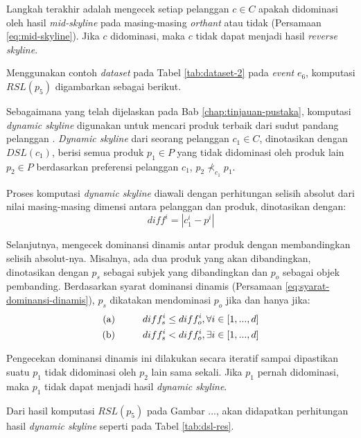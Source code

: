 Langkah terakhir adalah mengecek setiap pelanggan $c \in C$ apakah didominasi oleh hasil \textit{mid-skyline} pada masing-masing \textit{orthant} atau tidak (Persamaan \ref{eq:mid-skyline}). Jika $c$ didominasi, maka $c$ tidak dapat menjadi hasil \textit{reverse skyline}.

Menggunakan contoh \textit{dataset} pada Tabel \ref{tab:dataset-2} pada \textit{event} $e_6$, komputasi $RSL(p_5)$ digambarkan sebagai berikut.


Sebagaimana yang telah dijelaskan pada Bab \ref{chap:tinjauan-pustaka}, komputasi \textit{dynamic skyline} digunakan untuk mencari produk terbaik dari sudut pandang pelanggan \cite{kmpp}. \textit{Dynamic skyline} \cite{dynamic-skyline} dari seorang pelanggan $c_1 \in C$, dinotasikan dengan $DSL(c_1)$, berisi semua produk $p_1 \in P$ yang tidak didominasi oleh produk lain $p_2 \in P$ berdasarkan preferensi pelanggan $c_1$, $p_2 \nprec_{c_1} p_1$. 

Proses komputasi \textit{dynamic skyline} diawali dengan perhitungan selisih absolut dari nilai masing-masing dimensi antara pelanggan dan produk, dinotasikan dengan:
\begin{equation}\label{eq:diff}
diff^i = |c_1^i - p^i|
\end{equation}

Selanjutnya, mengecek dominansi dinamis antar produk dengan membandingkan selisih absolut-nya. Misalnya, ada dua produk yang akan dibandingkan, dinotasikan dengan $p_s$ sebagai subjek yang dibandingkan dan $p_o$ sebagai objek pembanding. Berdasarkan syarat dominansi dinamis (Persamaan \ref{eq:syarat-dominansi-dinamis}), $p_s$ dikatakan mendominasi $p_o$ jika dan hanya jika:
\begin{equation}\label{eq:komputasi-dsl}
\begin{split}
\text{(a)} \hspace*{1cm} diff_s^i \leq diff_o^i, \forall i \in [1, ..., d] \\
\text{(b)} \hspace*{1cm} diff_s^i < diff_o^i, \exists i \in [1, ..., d]
\end{split}
\end{equation}

Pengecekan dominansi dinamis ini dilakukan secara iteratif sampai dipastikan suatu $p_1$ tidak didominasi oleh $p_2$ lain sama sekali. Jika $p_1$ pernah didominasi, maka $p_1$ tidak dapat menjadi hasil \textit{dynamic skyline}.

Dari hasil komputasi $RSL(p_5)$ pada Gambar ..., akan didapatkan perhitungan hasil \textit{dynamic skyline} seperti pada Tabel \ref{tab:dsl-res}.

